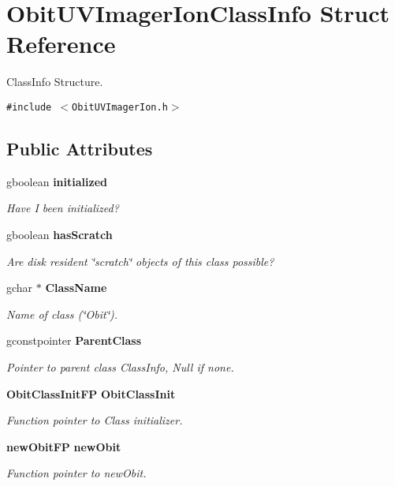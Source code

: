\section{Obit\-UVImager\-Ion\-Class\-Info Struct Reference}
\label{structObitUVImagerIonClassInfo}
Class\-Info Structure.  


{\tt \#include $<$Obit\-UVImager\-Ion.h$>$}

\subsection*{Public Attributes}
\begin{CompactItemize}
\item 
gboolean {\bf initialized}
\begin{CompactList}\small\item\em Have I been initialized? \item\end{CompactList}\item 
gboolean {\bf has\-Scratch}
\begin{CompactList}\small\item\em Are disk resident \char`\"{}scratch\char`\"{} objects of this class possible? \item\end{CompactList}\item 
gchar $\ast$ {\bf Class\-Name}
\begin{CompactList}\small\item\em Name of class (\char`\"{}Obit\char`\"{}). \item\end{CompactList}\item 
gconstpointer {\bf Parent\-Class}
\begin{CompactList}\small\item\em Pointer to parent class Class\-Info, Null if none. \item\end{CompactList}\item 
{\bf Obit\-Class\-Init\-FP} {\bf Obit\-Class\-Init}
\begin{CompactList}\small\item\em Function pointer to Class initializer. \item\end{CompactList}\item 
{\bf new\-Obit\-FP} {\bf new\-Obit}
\begin{CompactList}\small\item\em Function pointer to new\-Obit. \item\end{CompactList}\item 

\end{CompactItemize}
